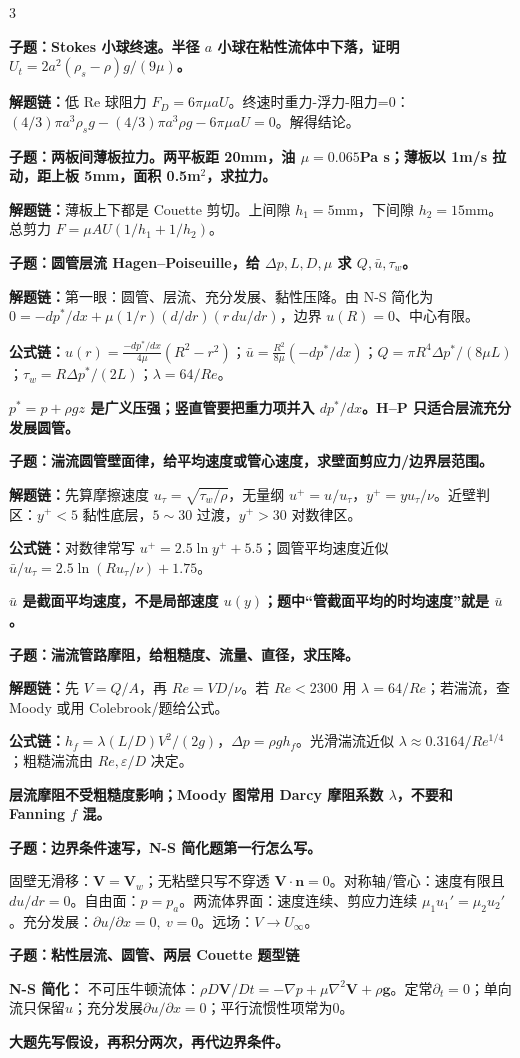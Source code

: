 \documentclass[a4paper]{article}
\newcommand{\qt}[1]{\vspace{0.25pt}\colorbox{Q}{\parbox{\dimexpr\linewidth-2\fboxsep}{\color{white}\bfseries #1}}\par}
\newcommand{\ans}[1]{\colorbox{G}{\parbox{\dimexpr\linewidth-2\fboxsep}{#1}}\par}
\newcommand{\warn}[1]{\colorbox{Y}{\parbox{\dimexpr\linewidth-2\fboxsep}{\color{E}\bfseries #1}}\par}
\newcommand{\chain}[1]{{\color{A}\bfseries 解题链：}#1\par}
\newcommand{\form}[1]{{\color{M}\bfseries 公式链：}#1\par}
\newcommand{\sect}[1]{\par{\bfseries\color{Q}#1：}}
\newcommand{\schemeviscous}{}
\begin{document}
\begin{multicols}{3}
\qt{子题：Stokes 小球终速。半径 $a$ 小球在粘性流体中下落，证明 $U_t=2a^2(\rho_s-\rho)g/(9\mu)$。}
\chain{低 Re 球阻力 $F_D=6\pi\mu aU$。终速时重力-浮力-阻力=0：$(4/3)\pi a^3\rho_sg-(4/3)\pi a^3\rho g-6\pi\mu aU=0$。解得结论。}

\qt{子题：两板间薄板拉力。两平板距 20mm，油 $\mu=0.065$Pa s；薄板以 1m/s 拉动，距上板 5mm，面积 0.5m$^2$，求拉力。}
\chain{薄板上下都是 Couette 剪切。上间隙 $h_1=5$mm，下间隙 $h_2=15$mm。总剪力 $F=\mu AU(1/h_1+1/h_2)$。}

\qt{子题：圆管层流 Hagen--Poiseuille，给 $\Delta p,L,D,\mu$ 求 $Q,\bar u,\tau_w$。}
\chain{第一眼：圆管、层流、充分发展、黏性压降。由 N-S 简化为 $0=-dp^*/dx+\mu(1/r)(d/dr)(r\,du/dr)$，边界 $u(R)=0$、中心有限。}
\form{$u(r)=\frac{-dp^*/dx}{4\mu}(R^2-r^2)$；$\bar u=\frac{R^2}{8\mu}(-dp^*/dx)$；$Q=\pi R^4\Delta p^*/(8\mu L)$；$\tau_w=R\Delta p^*/(2L)$；$\lambda=64/Re$。}
\warn{$p^*=p+\rho gz$ 是广义压强；竖直管要把重力项并入 $dp^*/dx$。H--P 只适合层流充分发展圆管。}

\qt{子题：湍流圆管壁面律，给平均速度或管心速度，求壁面剪应力/边界层范围。}
\chain{先算摩擦速度 $u_\tau=\sqrt{\tau_w/\rho}$，无量纲 $u^+=u/u_\tau$，$y^+=yu_\tau/\nu$。近壁判区：$y^+<5$ 黏性底层，$5\sim30$ 过渡，$y^+>30$ 对数律区。}
\form{对数律常写 $u^+=2.5\ln y^+ +5.5$；圆管平均速度近似 $\bar u/u_\tau=2.5\ln(Ru_\tau/\nu)+1.75$。}
\warn{$\bar u$ 是截面平均速度，不是局部速度 $u(y)$；题中“管截面平均的时均速度”就是 $\bar u$。}

\qt{子题：湍流管路摩阻，给粗糙度、流量、直径，求压降。}
\chain{先 $V=Q/A$，再 $Re=VD/\nu$。若 $Re<2300$ 用 $\lambda=64/Re$；若湍流，查 Moody 或用 Colebrook/题给公式。}
\form{$h_f=\lambda(L/D)V^2/(2g)$，$\Delta p=\rho gh_f$。光滑湍流近似 $\lambda\approx0.3164/Re^{1/4}$；粗糙湍流由 $Re,\varepsilon/D$ 决定。}
\warn{层流摩阻不受粗糙度影响；Moody 图常用 Darcy 摩阻系数 $\lambda$，不要和 Fanning $f$ 混。}

\qt{子题：边界条件速写，N-S 简化题第一行怎么写。}
\ans{固壁无滑移：$\bm V=\bm V_w$；无粘壁只写不穿透 $\bm V\cdot\bm n=0$。对称轴/管心：速度有限且 $du/dr=0$。自由面：$p=p_a$。两流体界面：速度连续、剪应力连续 $\mu_1u_1'=\mu_2u_2'$。充分发展：$\partial u/\partial x=0,\ v=0$。远场：$V\to U_\infty$。}


\qt{子题：粘性层流、圆管、两层 Couette 题型链}
{\fontsize{2.66}{2.82}\selectfont
\schemeviscous
\sect{N-S 简化}
不可压牛顿流体：$\rho D\bm V/Dt=-\nabla p+\mu\nabla^2\bm V+\rho\bm g$。定常$\partial_t=0$；单向流只保留$u$；充分发展$\partial u/\partial x=0$；平行流惯性项常为0。\\
\warn{大题先写假设，再积分两次，再代边界条件。}

}
\end{multicols}
\end{document}
